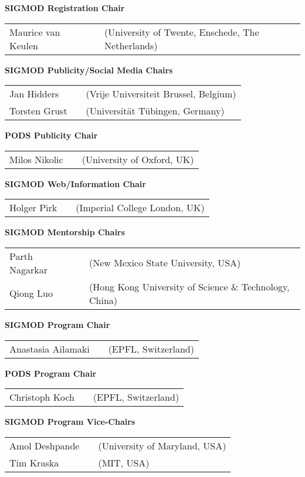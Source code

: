 {\vfill
\textbf{SIGMOD Registration Chair}

\begin{tabular}{lp{.5em}l}
Maurice van Keulen	&& \textsf{\small(University of Twente, Enschede, The Netherlands)}
\end{tabular}

\vfill
\textbf{SIGMOD Publicity/Social Media Chairs}

\begin{tabular}{lp{.5em}l}
Jan Hidders	&& \textsf{\small(Vrije Universiteit Brussel, Belgium)}	\\
Torsten Grust	&& \textsf{\small(Universität Tübingen, Germany)}
\end{tabular}

\vfill
\textbf{PODS Publicity Chair}

\begin{tabular}{lp{.5em}l}
Milos Nikolic	&& \textsf{\small(University of Oxford, UK)}
\end{tabular}

\vfill
\textbf{SIGMOD Web/Information Chair}

\begin{tabular}{lp{.5em}l}
Holger Pirk	&& \textsf{\small(Imperial College London, UK)}
\end{tabular}

\vfill
\textbf{SIGMOD Mentorship Chairs}

\begin{tabular}{lp{.5em}l}
Parth Nagarkar	&& \textsf{\small(New Mexico State University, USA)}	\\
Qiong Luo	&& \textsf{\small(Hong Kong University of Science \& Technology, China)}
\end{tabular}

\pagebreak

\textbf{SIGMOD Program Chair}

\begin{tabular}{lp{.5em}l}
Anastasia Ailamaki	&& \textsf{\small(EPFL, Switzerland)}
\end{tabular}

\vfill
\textbf{PODS Program Chair}

\begin{tabular}{lp{.5em}l}
Christoph Koch	&& \textsf{\small(EPFL, Switzerland)}
\end{tabular}

\vfill
\textbf{SIGMOD Program Vice-Chairs}

\begin{tabular}{lp{.5em}l}
Amol Deshpande	&& \textsf{\small(University of Maryland, USA)}	\\
Tim Kraska	&& \textsf{\small(MIT, USA)}
\end{tabular}

}
